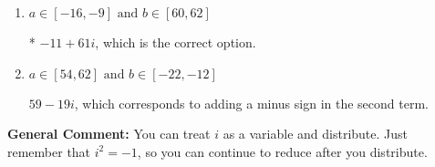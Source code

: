 \documentclass{extbook}[14pt]
\begin{document}
\begin{enumerate}
{\begin{enumerate}[label=\Alph*.]
 $-11 - 61 i$, which corresponds to adding a minus sign in both terms.
\item \( a \in [-16, -9] \text{ and } b \in [60, 62] \)

* $-11 + 61 i$, which is the correct option.
\item \( a \in [54, 62] \text{ and } b \in [-22, -12] \)

 $59 - 19 i$, which corresponds to adding a minus sign in the second term.
\end{enumerate}

\textbf{General Comment:} You can treat $i$ as a variable and distribute. Just remember that $i^2=-1$, so you can continue to reduce after you distribute.
}
\end{enumerate}
\end{document}
